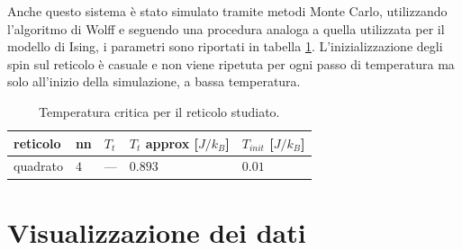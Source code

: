 \documentclass{article}
\begin{document}
Anche questo sistema è stato simulato tramite metodi Monte Carlo, utilizzando l'algoritmo di Wolff e seguendo una procedura analoga a quella utilizzata per il modello di Ising, i parametri sono riportati in tabella \ref{tab:ltXY}.
L'inizializzazione degli spin sul reticolo è casuale e non viene ripetuta per ogni passo di temperatura ma solo all'inizio della simulazione, a bassa temperatura.

\begin{table}[ht]
\begin{center}
\begin{tabular}{lllll}
\toprule
reticolo & nn & $T_t$ & $T_t$ approx [$J/k_B$] & $T_{init}$ [$J/k_B$]\\
\midrule
quadrato & $4$ & --- & $0.893$ & $0.01$\\
\bottomrule
\end{tabular}
\end{center}
\caption{Temperatura critica per il reticolo studiato.}
\label{tab:ltXY}
\end{table}

\section{Visualizzazione dei dati}
\end{document}

